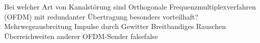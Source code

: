     {Bei welcher Art von Kanalstörung sind Orthogonale Frequenzmultiplexverfahren (OFDM) mit redundanter Übertragung besonders vorteilhaft?}
    {Mehrwegeausbreitung}
    {Impulse durch Gewitter}
    {Breitbandiges Rauschen}
    {Überreichweiten anderer OFDM-Sender}
    {false}{false}